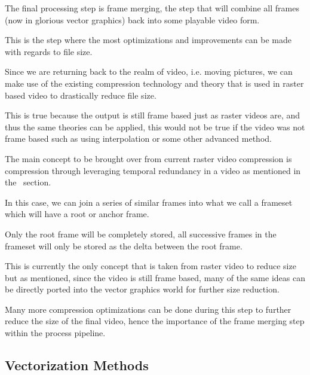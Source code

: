 \documentclass[12pt]{article}
\newcommand{\sentence}{} %
\begin{document}
    \tab
    The final processing step is frame merging, the step that will combine all frames (now in glorious vector
    graphics) back into some playable video form.
    \sentence
    This is the step where the most optimizations and improvements can be made with regards to file size.
    \sentence
    Since we are returning back to the realm of video, i.e. moving pictures, we can make use of the existing
    compression technology and theory that is used in raster based video to drastically reduce file size.
    \sentence
    This is true because the output is still frame based just as raster videos are, and thus the same theories can be
    applied, this would not be true if the video was not frame based such as using interpolation or some other
    advanced method.
    \sentence
    The main concept to be brought over from current raster video compression is compression through leveraging
    temporal redundancy in a video as mentioned in the~ section.
    \sentence
    In this case, we can join a series of similar frames into what we call a frameset which will have a root
    or anchor frame.
    \sentence
    Only the root frame will be completely stored, all successive frames in the frameset will only be stored as the
    delta between the root frame.
    \sentence
    This is currently the only concept that is taken from raster video to reduce size but as mentioned, since the
    video is still frame based, many of the same ideas can be directly ported into the vector graphics world for
    further size reduction.
    \sentence
    Many more compression optimizations can be done during this step to further reduce the size of the final
    video, hence the importance of the frame merging step within the process pipeline.


    \subsection{Vectorization Methods}\label{subsec:vectorization-methods}

\end{document}
